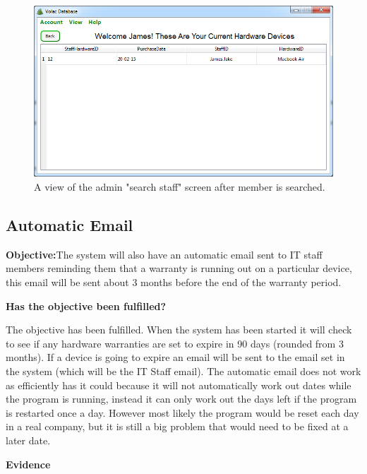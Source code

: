 \begin{figure}[H]
    \includegraphics[width=\textwidth]{./Evaluation/Images/login5.png}
    \caption{A view of the admin "search staff" screen after member is searched.} 
\end{figure}



\subsection{Automatic Email}

\textbf{Objective:}The system will also have an automatic email sent to IT staff members reminding them that a warranty is running out on a particular device, this email will be sent about 3 months before the end of the warranty period.

\textbf{Has the objective been fulfilled?}

The objective has been fulfilled. When the system has been started it will check to see if any hardware warranties  are set to expire in 90 days (rounded from 3 months). If a device is going to expire an email will be sent to the email set in the system (which will be the IT Staff email). The automatic email does not work as efficiently has it could because it will not automatically work out dates while the program is running, instead it can only work out the days left if the program is restarted once a day. However most likely the program would be reset each day in a real company, but it is still a big problem that would need to be fixed at a later date.

\textbf{Evidence}

